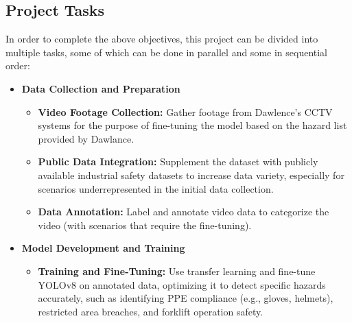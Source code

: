 \documentclass[12pt]{article}
\begin{document}
\subsection*{Project Tasks}
In order to complete the above objectives, this project can be divided into multiple tasks, some of which can be done in parallel and some in sequential order:

\begin{itemize}
    \item \textbf{Data Collection and Preparation}
    \begin{itemize}
        \item \textbf{Video Footage Collection:} Gather footage from Dawlence's CCTV systems for the purpose of fine-tuning the model based on the hazard list provided by Dawlance.
        \item \textbf{Public Data Integration:} Supplement the dataset with publicly available industrial safety datasets to increase data variety, especially for scenarios underrepresented in the initial data collection.
        \item \textbf{Data Annotation:} Label and annotate video data to categorize the video (with scenarios that require the fine-tuning).
    \end{itemize}

    \item \textbf{Model Development and Training}
    \begin{itemize}
        \item \textbf{Training and Fine-Tuning:} Use transfer learning and fine-tune YOLOv8 on annotated data, optimizing it to detect specific hazards accurately, such as identifying PPE compliance (e.g., gloves, helmets), restricted area breaches, and forklift operation safety.
    \end{itemize}


\end{itemize}
\end{document}
